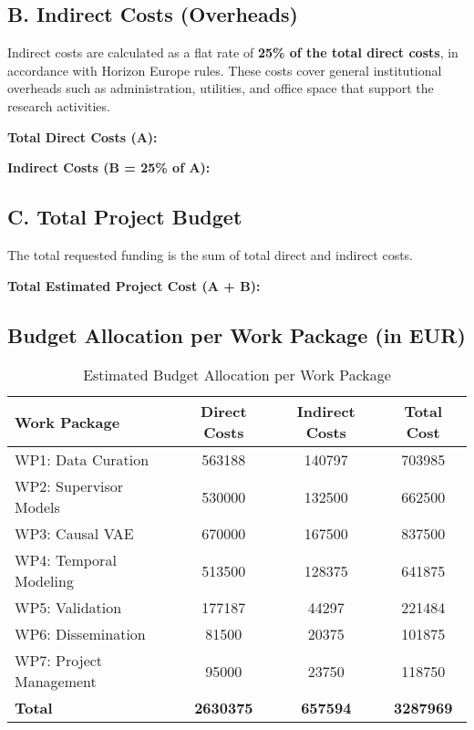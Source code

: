 \subsection*{B. Indirect Costs (Overheads)}
Indirect costs are calculated as a flat rate of \textbf{25\% of the total direct costs}, in accordance with Horizon Europe rules. These costs cover general institutional overheads such as administration, utilities, and office space that support the research activities.

\textbf{Total Direct Costs (A): }

\textbf{Indirect Costs (B = 25\% of A): }

\subsection*{C. Total Project Budget}
The total requested funding is the sum of total direct and indirect costs.

\textbf{Total Estimated Project Cost (A + B):} 

\subsection*{Budget Allocation per Work Package (in EUR)}

\begin{table}[H]
\centering
\caption{Estimated Budget Allocation per Work Package}
\label{tab:budget_wp}
\begin{tabular}{lS[table-format=7.0]S[table-format=7.0]S[table-format=7.0]}
\toprule
\textbf{Work Package} & {\textbf{Direct Costs}} & {\textbf{Indirect Costs}} & {\textbf{Total Cost}} \\
\midrule
WP1: Data Curation & 563188 & 140797 & 703985 \\
WP2: Supervisor Models & 530000 & 132500 & 662500 \\
WP3: Causal VAE & 670000 & 167500 & 837500 \\
WP4: Temporal Modeling & 513500 & 128375 & 641875 \\
WP5: Validation & 177187 & 44297 & 221484 \\
WP6: Dissemination & 81500 & 20375 & 101875 \\
WP7: Project Management & 95000 & 23750 & 118750 \\
\midrule
\textbf{Total} & {\textbf{2630375}} & {\textbf{657594}} & {\textbf{3287969}} \\
\bottomrule
\end{tabular}
\end{table}